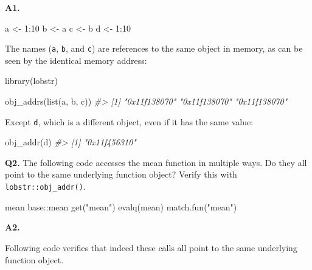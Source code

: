 \documentclass[
]{book}
\newenvironment{Shaded}{\begin{snugshade}}{\end{snugshade}}
\newcommand{\CommentTok}[1]{\textcolor[rgb]{0.56,0.35,0.01}{\textit{#1}}}
\newcommand{\DecValTok}[1]{\textcolor[rgb]{0.00,0.00,0.81}{#1}}
\newcommand{\FunctionTok}[1]{\textcolor[rgb]{0.00,0.00,0.00}{#1}}
\newcommand{\NormalTok}[1]{#1}
\newcommand{\OtherTok}[1]{\textcolor[rgb]{0.56,0.35,0.01}{#1}}
\newcommand{\SpecialCharTok}[1]{\textcolor[rgb]{0.00,0.00,0.00}{#1}}
\newcommand{\StringTok}[1]{\textcolor[rgb]{0.31,0.60,0.02}{#1}}
\begin{document}
\textbf{A1.}

\begin{Shaded}
\begin{Highlighting}[]
\NormalTok{a }\OtherTok{\textless{}{-}} \DecValTok{1}\SpecialCharTok{:}\DecValTok{10}
\NormalTok{b }\OtherTok{\textless{}{-}}\NormalTok{ a}
\NormalTok{c }\OtherTok{\textless{}{-}}\NormalTok{ b}
\NormalTok{d }\OtherTok{\textless{}{-}} \DecValTok{1}\SpecialCharTok{:}\DecValTok{10}
\end{Highlighting}
\end{Shaded}

The names (\texttt{a}, \texttt{b}, and \texttt{c}) are references to the same object in memory, as can be seen by the identical memory address:

\begin{Shaded}
\begin{Highlighting}[]
\FunctionTok{library}\NormalTok{(lobstr)}

\FunctionTok{obj\_addrs}\NormalTok{(}\FunctionTok{list}\NormalTok{(a, b, c))}
\CommentTok{\#\textgreater{} [1] "0x11f138070" "0x11f138070" "0x11f138070"}
\end{Highlighting}
\end{Shaded}

Except \texttt{d}, which is a different object, even if it has the same value:

\begin{Shaded}
\begin{Highlighting}[]
\FunctionTok{obj\_addr}\NormalTok{(d)}
\CommentTok{\#\textgreater{} [1] "0x11f456310"}
\end{Highlighting}
\end{Shaded}

\textbf{Q2.} The following code accesses the mean function in multiple ways. Do they all point to the same underlying function object? Verify this with \texttt{lobstr::obj\_addr()}.

\begin{Shaded}
\begin{Highlighting}[]
\NormalTok{mean}
\NormalTok{base}\SpecialCharTok{::}\NormalTok{mean}
\FunctionTok{get}\NormalTok{(}\StringTok{"mean"}\NormalTok{)}
\FunctionTok{evalq}\NormalTok{(mean)}
\FunctionTok{match.fun}\NormalTok{(}\StringTok{"mean"}\NormalTok{)}
\end{Highlighting}
\end{Shaded}

\textbf{A2.}

Following code verifies that indeed these calls all point to the same underlying function object.
\end{document}
